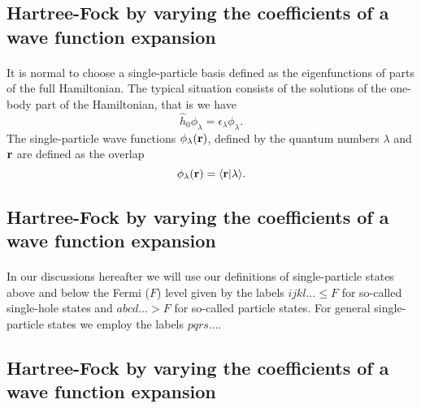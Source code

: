 \documentclass[%
twoside,                 %
final,                   %
10pt]{article}
\begin{document}
\subsection{Hartree-Fock by varying the coefficients of a wave function expansion}

\paragraph{}
It is normal to choose a single-particle basis defined as the eigenfunctions
of parts of the full Hamiltonian. The typical situation consists of the solutions of the one-body part of the Hamiltonian, that is we have
\[
\hat{h}_0\phi_{\lambda}=\epsilon_{\lambda}\phi_{\lambda}.
\]
The single-particle wave functions $\phi_{\lambda}({\bf r})$, defined by the quantum numbers $\lambda$ and ${\bf r}$
are defined as the overlap 
\[
   \phi_{\lambda}({\bf r})  = \langle {\bf r} | \lambda \rangle .
\]



\subsection{Hartree-Fock by varying the coefficients of a wave function expansion}

\paragraph{}
In our discussions hereafter we will use our definitions of single-particle states above and below the Fermi ($F$) level given by the labels
$ijkl\dots \le F$ for so-called single-hole states and $abcd\dots > F$ for so-called particle states.
For general single-particle states we employ the labels $pqrs\dots$.




\subsection{Hartree-Fock by varying the coefficients of a wave function expansion}

\end{document}
